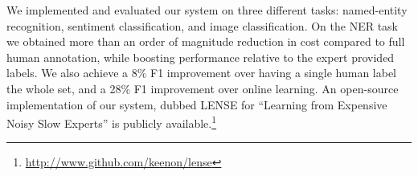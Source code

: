 We implemented and evaluated our system on three different tasks: named-entity
recognition, sentiment classification, and image classification.
On the NER task we obtained more than an order of magnitude reduction in cost compared to full human annotation, while boosting performance relative to the expert provided labels. We also achieve a 8\% F1 improvement over having a single human label the whole set, and a 28\% F1 improvement over online learning.
An open-source implementation of our system, dubbed LENSE for ``Learning from Expensive Noisy Slow Experts'' is publicly available.\footnote{%
\href{http://www.github.com/keenon/lense}{http://www.github.com/keenon/lense}}
